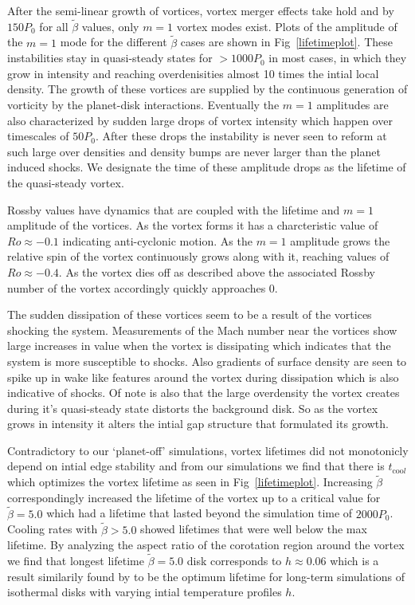 After the semi-linear growth of vortices, vortex merger effects take
hold and by $150P_0$ for all $\tilde\beta$ values, only $m=1$ vortex
modes exist. Plots of the amplitude of the $m=1$ mode for the
different $\tilde\beta$ cases are shown in
Fig~\ref{lifetimeplot}. These instabilities stay in quasi-steady
states for $>1000P_0$ in most cases, in which they grow in intensity
and reaching overdenisities almost 10 times the intial local
density. The growth of these vortices are supplied by the continuous
generation of vorticity by the planet-disk interactions. Eventually
the $m=1$ amplitudes are also characterized by sudden large drops of
vortex intensity which happen over timescales of $50P_0$. After these
drops the instability is never seen to reform at such large over
densities and density bumps are never larger than the planet induced
shocks. We designate the time of these amplitude drops as the lifetime
of the quasi-steady vortex.  

Rossby values have dynamics that are coupled with the lifetime and
$m=1$ amplitude of the vortices. As the vortex forms it has a
charcteristic value of $Ro\approx-0.1$ indicating anti-cyclonic
motion. As the $m=1$ amplitude grows the relative spin of the vortex
continuously grows along with it, reaching values of
$Ro\approx-0.4$. As the vortex dies off as described above the
associated Rossby number of the vortex accordingly quickly approaches
0. 

The sudden dissipation of these vortices seem to be a result of the
vortices shocking the system. Measurements of the Mach number near the
vortices show large increases in value when the vortex is dissipating
which indicates that the system is more susceptible to shocks. Also
gradients of surface density are seen to spike up in wake like
features around the vortex during dissipation which is also indicative
of shocks. Of note is also that the large overdensity the vortex
creates during it's quasi-steady state distorts the background
disk. So as the vortex grows in intensity it alters the intial gap
structure that formulated its growth. 

Contradictory to our `planet-off' simulations, vortex lifetimes did
not monotonicly depend on intial edge stability and from our
simulations we find that there is $t_{\mathrm{coo}l}$ which optimizes
the vortex lifetime as seen in Fig~\ref{lifetimeplot}. Increasing
$\tilde\beta$ correspondingly increased the lifetime of the vortex up
to a critical value for $\tilde{\beta}=5.0$ which had a lifetime that
lasted beyond the simulation time of $2000P_0$. Cooling rates with
$\tilde\beta>5.0$ showed lifetimes that were well below the max
lifetime. By analyzing the aspect ratio of the corotation region
around the vortex we find that longest lifetime $\tilde\beta=5.0$ disk
corresponds to $h\approx0.06$ which is a result similarily found by
\citet{fu14} to be the optimum lifetime for long-term simulations of
isothermal disks with varying intial temperature profiles $h$. 

